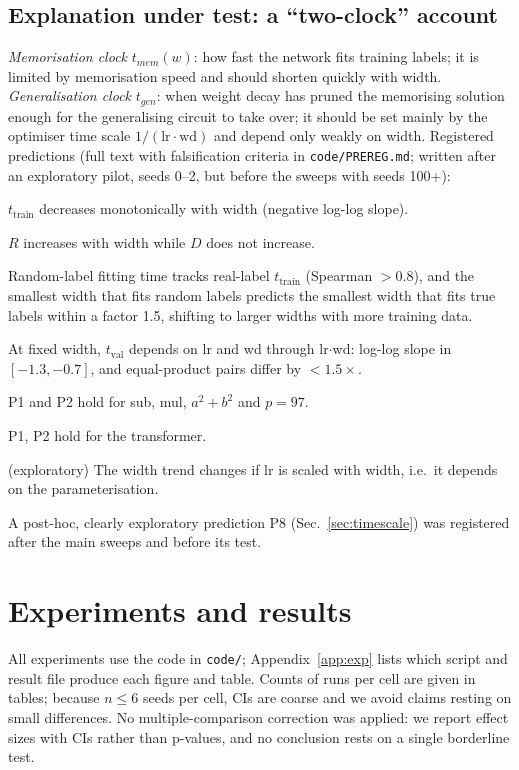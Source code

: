 \documentclass{article}
\newcommand{\ttr}{t_{\mathrm{train}}}
\newcommand{\tva}{t_{\mathrm{val}}}
\begin{document}
\subsection{Explanation under test: a ``two-clock'' account}\label{sec:hyp}
\emph{Memorisation clock} $t_{mem}(w)$: how fast the network fits training labels; it is limited by memorisation speed and should shorten quickly with width.
\emph{Generalisation clock} $t_{gen}$: when weight decay has pruned the memorising solution enough for the generalising circuit to take over; it should be set mainly by the optimiser time scale $1/(\mathrm{lr}\cdot\mathrm{wd})$ and depend only weakly on width.
Registered predictions (full text with falsification criteria in \texttt{code/PREREG.md}; written after an exploratory pilot, seeds 0--2, but before the sweeps with seeds 100+):
\begin{description}\setlength\itemsep{0pt}
\item[P1] $\ttr$ decreases monotonically with width (negative log-log slope).
\item[P2] $R$ increases with width while $D$ does not increase.
\item[P3] Random-label fitting time tracks real-label $\ttr$ (Spearman $>0.8$), and the smallest width that fits random labels predicts the smallest width that fits true labels within a factor 1.5, shifting to larger widths with more training data.
\item[P4] At fixed width, $\tva$ depends on lr and wd through lr$\cdot$wd: log-log slope in $[-1.3,-0.7]$, and equal-product pairs differ by $<1.5\times$.
\item[P5] P1 and P2 hold for sub, mul, $a^2{+}b^2$ and $p{=}97$.
\item[P6] P1, P2 hold for the transformer.
\item[P7] (exploratory) The width trend changes if lr is scaled with width, i.e.\ it depends on the parameterisation.
\end{description}
A post-hoc, clearly exploratory prediction P8 (Sec.~\ref{sec:timescale}) was registered after the main sweeps and before its test.

\section{Experiments and results}
All experiments use the code in \texttt{code/}; Appendix~\ref{app:exp} lists which script and result file produce each figure and table.
Counts of runs per cell are given in tables; because $n\le6$ seeds per cell, CIs are coarse and we avoid claims resting on small differences.
No multiple-comparison correction was applied: we report effect sizes with CIs rather than p-values, and no conclusion rests on a single borderline test.
\end{document}
